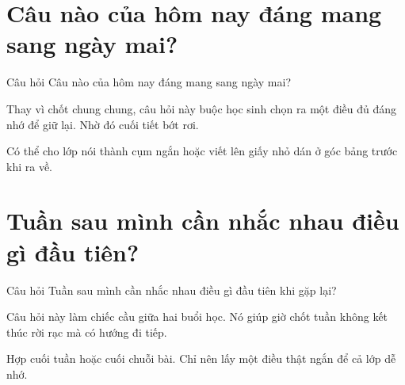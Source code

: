 \section{Câu nào của hôm nay đáng mang sang ngày mai?}
\begin{cauhoibox}{Câu hỏi}
Câu nào của hôm nay đáng mang sang ngày mai?
\end{cauhoibox}
\begin{taisaocoich}
Thay vì chốt chung chung, câu hỏi này buộc học sinh chọn ra một điều đủ đáng nhớ để giữ lại. Nhờ đó cuối tiết bớt rơi.
\end{taisaocoich}
\begin{goiybien}
Có thể cho lớp nói thành cụm ngắn hoặc viết lên giấy nhỏ dán ở góc bảng trước khi ra về.
\end{goiybien}
\ngancach

\section{Tuần sau mình cần nhắc nhau điều gì đầu tiên?}
\begin{cauhoibox}{Câu hỏi}
Tuần sau mình cần nhắc nhau điều gì đầu tiên khi gặp lại?
\end{cauhoibox}
\begin{taisaocoich}
Câu hỏi này làm chiếc cầu giữa hai buổi học. Nó giúp giờ chốt tuần không kết thúc rời rạc mà có hướng đi tiếp.
\end{taisaocoich}
\begin{goiybien}
Hợp cuối tuần hoặc cuối chuỗi bài. Chỉ nên lấy một điều thật ngắn để cả lớp dễ nhớ.
\end{goiybien}
